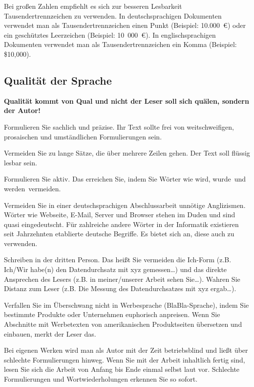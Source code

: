 \documentclass{llncs}
\begin{document}
Bei großen Zahlen empfiehlt es sich zur besseren Lesbarkeit Tausendertrennzeichen zu verwenden. In deutschsprachigen Dokumenten verwendet man als Tausendertrennzeichen einen Punkt (Beispiel: 10.000~\euro) oder ein geschütztes Leerzeichen (Beispiel: 10~000~\euro). In englischsprachigen Dokumenten verwendet man als Tausendertrennzeichen ein Komma (Beispiel: \$10,000).

\subsection{Qualität der Sprache}

\textbf{Qualität kommt von Qual und nicht der Leser soll sich quälen, sondern der Autor!}

Formulieren Sie sachlich und präzise. Ihr Text sollte frei von weitschweifigen, prosaischen und umständlichen Formulierungen sein.

Vermeiden Sie zu lange Sätze, die über mehrere Zeilen gehen. Der Text soll flüssig lesbar sein.

Formulieren Sie aktiv. Das erreichen Sie, indem Sie Wörter wie \glqq wird\grqq, \glqq wurde\grqq\ und \glqq werden\grqq\ vermeiden.

Vermeiden Sie in einer deutschsprachigen Abschlussarbeit unnötige Anglizismen. Wörter wie Webseite, E-Mail, Server und Browser stehen im Duden und sind quasi eingedeutscht. Für zahlreiche andere Wörter in der Informatik existieren seit Jahrzehnten etablierte deutsche Begriffe. Es bietet sich an, diese auch zu verwenden.

Schreiben in der dritten Person. Das heißt Sie vermeiden die Ich-Form (z.B. \glqq Ich/Wir habe(n) den Datendurchsatz mit xyz gemessen\dots\grqq) und das direkte Ansprechen des Lesers (z.B. \glqq in meiner/unserer Arbeit sehen Sie\dots\grqq). Wahren Sie Distanz zum Leser (z.B. \glqq Die Messung des Datendurchsatzes mit xyz ergab\dots\grqq).

Verfallen Sie im Überschwang nicht in Werbesprache (\glqq BlaBla-Sprache\grqq), indem Sie bestimmte Produkte oder Unternehmen euphorisch anpreisen. Wenn Sie Abschnitte mit Werbetexten von amerikanischen Produktseiten übersetzen und einbauen, merkt der Leser das.

Bei eigenen Werken wird man als Autor mit der Zeit betriebsblind und ließt über schlechte Formulierungen hinweg. Wenn Sie mit der Arbeit inhaltlich fertig sind, lesen Sie sich die Arbeit von Anfang bis Ende einmal selbst laut vor. Schlechte Formulierungen und Wortwiederholungen erkennen Sie so sofort.
\end{document}
